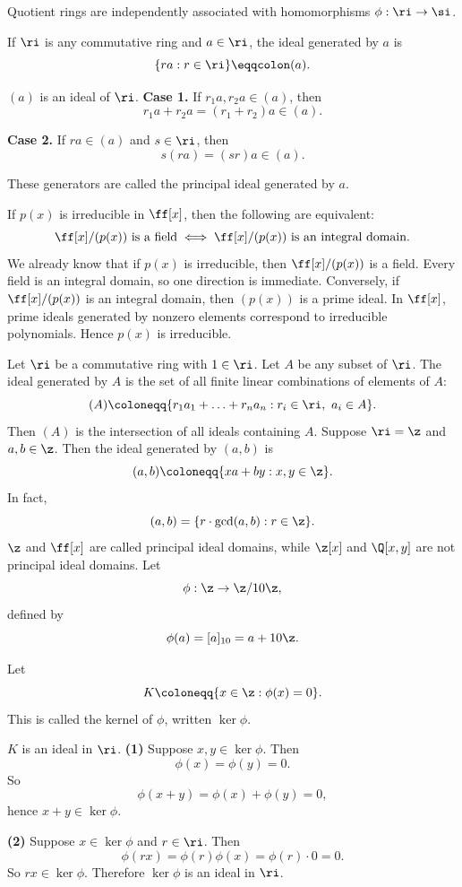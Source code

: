 Quotient rings are independently associated with homomorphisms $\phi:\ri\to\si$.

\begin{definition}[Generators]
If $\ri$ is any commutative ring and $a\in \ri$, the ideal generated by $a$ is
\[
\{ra:r\in \ri\}\eqqcolon (a).
\]
\end{definition}

\begin{lemma}{
$(a)$ is an ideal of $\ri$.
}
\textbf{Case 1.}
If $r_{1}a,r_{2}a\in (a)$, then
\[
r_{1}a+r_{2}a=(r_1+r_2)a\in (a).
\]

\textbf{Case 2.}
If $ra\in (a)$ and $s\in \ri$, then
\[
s(ra)=(sr)a\in (a).
\]
\end{lemma}

These generators are called the principal ideal generated by $a$.

\begin{theorem}{
If $p(x)$ is irreducible in $\ff[x]$, then the following are equivalent:
\[
\ff[x]/(p(x)) \text{ is a field}
\iff
\ff[x]/(p(x)) \text{ is an integral domain}.
\]
}
We already know that if $p(x)$ is irreducible, then $\ff[x]/(p(x))$ is a field.
Every field is an integral domain, so one direction is immediate.
Conversely, if $\ff[x]/(p(x))$ is an integral domain, then $(p(x))$ is a prime ideal.
In $\ff[x]$, prime ideals generated by nonzero elements correspond to irreducible polynomials.
Hence $p(x)$ is irreducible.
\end{theorem}

Let $\ri$ be a commutative ring with $1\in \ri$.
Let $A$ be any subset of $\ri$.
The ideal generated by $A$ is the set of all finite linear combinations of elements of $A$:
\[
(A)\coloneqq \{r_{1}a_1+\hdots+r_{n}a_n:r_i\in \ri,\ a_i\in A\}.
\]
Then $(A)$ is the intersection of all ideals containing $A$.
Suppose $\ri=\z$ and $a,b\in \z$.
Then the ideal generated by $(a,b)$ is
\[
(a,b)\coloneqq \{xa+by:x,y\in \z\}.
\]
In fact,
\[
(a,b)=\{r\cdot \gcd(a,b):r\in \z\}.
\]
$\z$ and $\ff[x]$ are called principal ideal domains, while $\z[x]$ and $\Q[x,y]$ are not principal ideal domains.
Let
\[
\phi:\z\to \z/10\z,
\]
defined by
\[
\phi(a)=[a]_{10}=a+10\z.
\]

\begin{definition}[Kernel]
Let
\[
K\coloneqq \{x\in \z:\phi(x)=0\}.
\]
This is called the kernel of $\phi$, written $\ker\phi$.
\end{definition}

\begin{theorem}{
$K$ is an ideal in $\ri$.
}
\textbf{(1)}
Suppose $x,y\in \ker\phi$.
Then
\[
\phi(x)=\phi(y)=0.
\]
So
\[
\phi(x+y)=\phi(x)+\phi(y)=0,
\]
hence $x+y\in \ker\phi$.

\textbf{(2)}
Suppose $x\in \ker\phi$ and $r\in \ri$.
Then
\[
\phi(rx)=\phi(r)\phi(x)=\phi(r)\cdot 0=0.
\]
So $rx\in \ker\phi$.
Therefore $\ker\phi$ is an ideal in $\ri$.
\end{theorem}

